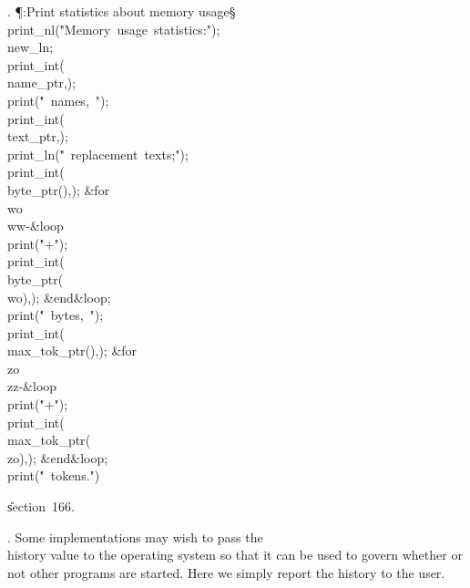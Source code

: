 . \P\?:Print statistics about memory usage\X\S\?\6
\\{print\_nl}\?\1(\?\.{"Memory\ usage\ statistics:"}\?\2)\?;\5
\\{new\_ln};\5
\\{print\_int}\?\1(\?\\{name\_ptr}\?,\?\2)\?;\5
\\{print}\?\1(\?\.{"\ names,\ "}\?\2)\?;\5
\\{print\_int}\?\1(\?\\{text\_ptr}\?,\?\2)\?;\5
\\{print\_ln}\?\1(\?\.{"\ replacement\ texts;"}\?\2)\?;\5
\\{print\_int}\?\1(\?\\{byte\_ptr}\?\1(\?\2),\?\2)\?;\6
\1\&{for}\8\\{wo}\?\in{}\?\to\?\\{ww}\?-\8\&{loop}\6
\\{print}\?\1(\?\.{"+"}\?\2)\?;\5
\\{print\_int}\?\1(\?\\{byte\_ptr}\?\1(\?\\{wo}\?\2),\?\2)\?;\2\6
\&{end}\8\&{loop};\6
\\{print}\?\1(\?\.{"\ bytes,\ "}\?\2)\?;\5
\\{print\_int}\?\1(\?\\{max\_tok\_ptr}\?\1(\?\2),\?\2)\?;\6
\1\&{for}\8\\{zo}\?\in{}\?\to\?\\{zz}\?-\8\&{loop}\6
\\{print}\?\1(\?\.{"+"}\?\2)\?;\5
\\{print\_int}\?\1(\?\\{max\_tok\_ptr}\?\1(\?\\{zo}\?\2),\?\2)\?;\2\6
\&{end}\8\&{loop};\6
\\{print}\?\1(\?\.{"\ tokens."}\?\2)\?\par
\U section~166\*.\fi

. Some implementations may wish to pass the \\{history} value to the
operating system so that it can be used to govern whether or not other
programs are started. Here we simply report the history to the user.

